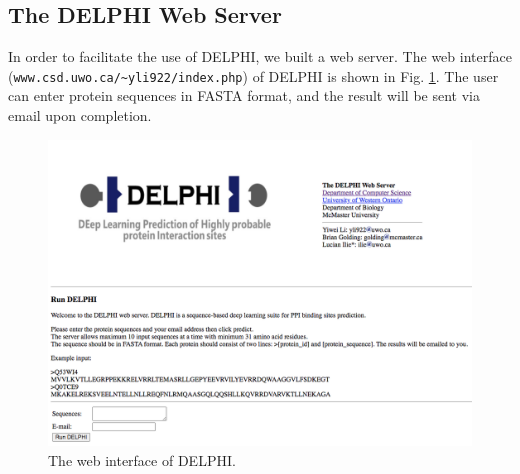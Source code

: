 \subsection{The DELPHI Web Server}
In order to facilitate the use of DELPHI, we built a web server. The web interface (\texttt{www.csd.uwo.ca/\textasciitilde{}yli922/index.php}) of DELPHI is shown in Fig. \ref{fig_DELPHI_web}. The user can enter protein sequences in FASTA format, and the result will be sent via email upon completion. 
\begin{figure}[h!]
\begin{center}
\includegraphics[width =13 cm]{img/DELPHI_web_server.png}
\caption[The web interface of DELPHI]{The web interface of DELPHI. \label{fig_DELPHI_web}}
\end{center}
\end{figure} 

